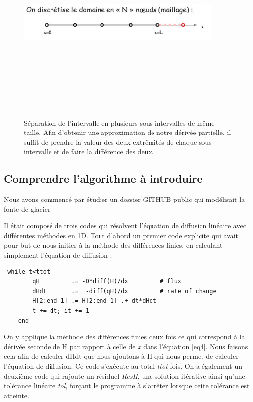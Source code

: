 \documentclass{article}
\begin{document}
\begin{figure}[!htpb]
\centering
\includegraphics[width=10cm, keepaspectratio=true, height=10cm]{Differences.png}
\caption{Séparation de l'intervalle en plusieurs sous-intervalles de même taille. Afin d'obtenir une approximation de notre dérivée partielle, il suffit de prendre la valeur des deux extrêmités de chaque sous-intervalle et de faire la différence des deux.}
\label{differences}
\end{figure}

\subsection{Comprendre l'algorithme à introduire}
Nous avons commencé par étudier un dossier GITHUB public \cite{site2} qui modélisait la fonte de glacier.
\newline

 Il était composé de trois codes qui résolvent l'équation de diffusion linéaire avec différentes méthodes en 1D. 
\newline
Tout d'abord un premier code explicite qui avait pour but de nous initier à la méthode des différences finies, en calculant simplement l'équation de diffusion : 

\begin{verbatim}
 while t<ttot
        qH         .= -D*diff(H)/dx         # flux
        dHdt       .=  -diff(qH)/dx         # rate of change
        H[2:end-1] .= H[2:end-1] .+ dt*dHdt
        t += dt; it += 1
    end
\end{verbatim}
 On y applique la méthode des différences finies deux fois ce qui correspond à la dérivée seconde de H par rapport à celle de \textit{x} dans l'équation \ref{eq4}. Nous faisons cela afin de calculer dHdt que nous ajoutons à H  qui nous permet de calculer l'équation de diffusion. Ce code s'exécute au total \textit{ttot} fois.
\newpage
On a également un deuxième code qui rajoute un résiduel \textit{ResH}, une solution itérative ainsi qu'une tolérance linéaire \textit{tol}, forçant le programme à s'arrêter lorsque cette tolérance est atteinte.
\end{document}
